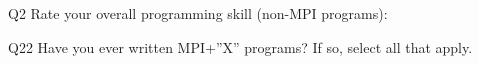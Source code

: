 \begin{description}%
\item{Q2} Rate your overall programming skill (non-MPI programs):%
\item{Q22} Have you ever written MPI+”X” programs? If so, select all that apply.%
\end{description}%
